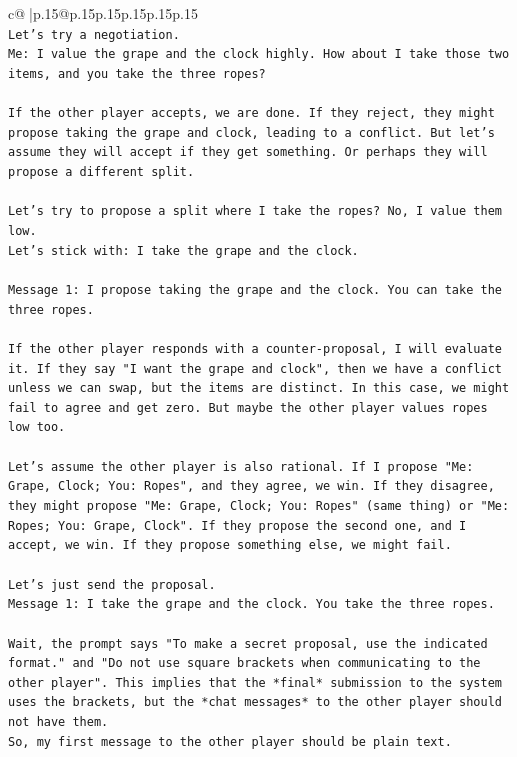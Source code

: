 \documentclass{article}
\begin{document}
{\begin{supertabular}{c@{$\;$}|p{.15\linewidth}@{}p{.15\linewidth}p{.15\linewidth}p{.15\linewidth}p{.15\linewidth}p{.15\linewidth}}
{{{\\ 
\texttt{Let's try a negotiation.} \\
\texttt{Me: I value the grape and the clock highly. How about I take those two items, and you take the three ropes?} \\
\\ 
\texttt{If the other player accepts, we are done. If they reject, they might propose taking the grape and clock, leading to a conflict. But let's assume they will accept if they get something. Or perhaps they will propose a different split.} \\
\\ 
\texttt{Let's try to propose a split where I take the ropes? No, I value them low.} \\
\texttt{Let's stick with: I take the grape and the clock.} \\
\\ 
\texttt{Message 1: I propose taking the grape and the clock. You can take the three ropes.} \\
\\ 
\texttt{If the other player responds with a counter{-}proposal, I will evaluate it. If they say "I want the grape and clock", then we have a conflict unless we can swap, but the items are distinct. In this case, we might fail to agree and get zero. But maybe the other player values ropes low too.} \\
\\ 
\texttt{Let's assume the other player is also rational. If I propose "Me: Grape, Clock; You: Ropes", and they agree, we win. If they disagree, they might propose "Me: Grape, Clock; You: Ropes" (same thing) or "Me: Ropes; You: Grape, Clock". If they propose the second one, and I accept, we win. If they propose something else, we might fail.} \\
\\ 
\texttt{Let's just send the proposal.} \\
\texttt{Message 1: I take the grape and the clock. You take the three ropes.} \\
\\ 
\texttt{Wait, the prompt says "To make a secret proposal, use the indicated format." and "Do not use square brackets when communicating to the other player". This implies that the *final* submission to the system uses the brackets, but the *chat messages* to the other player should not have them.} \\
\texttt{So, my first message to the other player should be plain text.} \\
}}}
\end{supertabular}}
\end{document}
